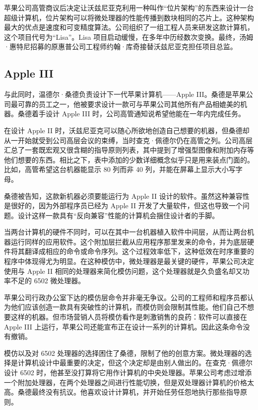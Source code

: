 \documentclass[12pt,UTF8]{ctexbook}
\begin{document}
苹果公司高管商议后决定让沃兹尼亚克利用一种叫作“位片架构”的东西来设计一台超级计算机，位片架构可以将微处理器的性能传播到数块相同的芯片上。这种架构最大的优点是速度和可变精度算法。公司组织了一组工程人员来研发这款计算机，这个项目代号为“Lisa”。Lisa 项目启动缓慢，在多年中历经数次变换。最终，汤姆·惠特尼招募的原惠普公司工程师约翰·库奇接替沃兹尼亚克担任项目总监。





\subsection{Apple III}


与此同时，温德尔·桑德负责设计下一代苹果计算机——Apple III。桑德是苹果公司最可靠的员工之一，他被要求设计一款可与苹果公司其他所有产品相媲美的机器。桑德着手设计 Apple III 时，公司高管通知说希望他能在一年内完成任务。

在设计 Apple II 时，沃兹尼亚克可以随心所欲地创造自己想要的机器，但桑德却从一开始就受到公司高层会议的束缚，当时查克·佩德尔仍在高管之列。公司高层汇总了一套既宏观又很含糊的指导原则列表，其中提到了增强型图像和附加内存等他们想要的东西。相比之下，表中添加的少数详细概念似乎只是用来装点门面的。比如，高管希望这台机器能显示 80 列而非 40 列，并能在屏幕上显示大小写字母。

桑德被告知，这款新机器必须要能运行为 Apple II 设计的软件。虽然这种兼容性是很好的，因为外部程序员已经为 Apple II 开发了大量软件，但这也导致一个问题。设计这样一款具有“反向兼容”性能的计算机会捆住设计者的手脚。

当两台计算机的硬件不同时，可以在其中一台机器植入软件中间层，从而让两台机器运行同样的应用软件。这个附加层拦截从应用程序那里发来的命令，并为底层硬件将其翻译成相应的命令或命令序列。这个过程效率低下，这种低效在时序重要的程序中体现得尤为明显。在这种模仿中，微处理器是最关键的硬件，苹果公司决定使用与 Apple II 相同的处理器来简化模仿问题，这个处理器就是久负盛名却又功率不足的 6502 微处理器。

苹果公司行政办公室下达的模仿层命令并非毫无争议。公司的工程师和程序员都认为他们应该创造一款具有突破性的计算机，而模仿则会限制其性能。他们自己不想要这样的机器。但市场营销人员将模仿看作是刺激销售的良药：软件可以直接在 Apple III 上运行，苹果公司还能宣布正在设计一系列的计算机。因此这条命令没有撤销。

模仿以及对 6502 处理器的选择困住了桑德，限制了他的创意方案。微处理器的选择是计算机设计中最重要的决定，但这个决定却是由别人做出的。在查克·佩德尔设计 6502 时，他甚至没打算将它用作计算机的中央处理器。苹果公司考虑过增添一个附加处理器，在两个处理器之间进行性能切换，但是双处理器计算机的价格太高。桑德最终没有抗议。他喜欢设计计算机，并开始任劳任怨地执行那些指导原则。
\end{document}
